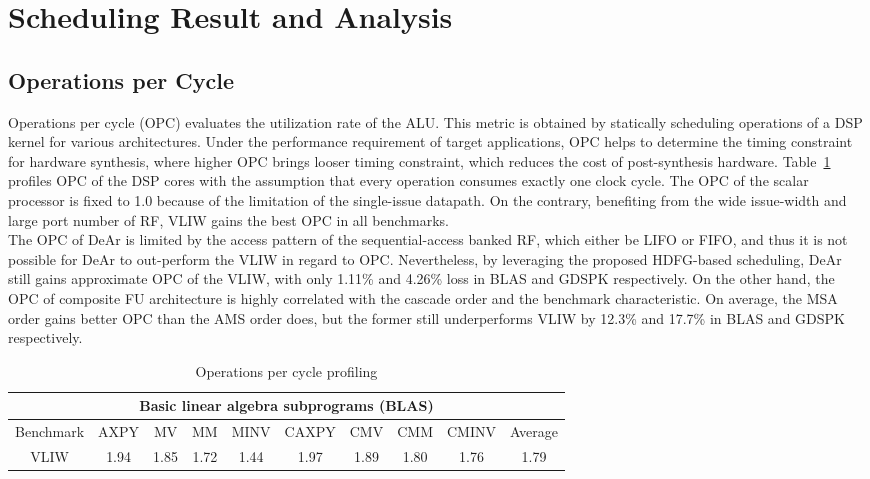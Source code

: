 \section{Scheduling Result and Analysis}
{
    \subsection{Operations per Cycle}
    Operations per cycle (OPC) evaluates the utilization rate of the ALU.
    This metric is obtained by statically scheduling operations of a DSP kernel for various architectures.
    Under the performance requirement of target applications, OPC helps to determine the timing constraint for hardware synthesis, 
    where higher OPC brings looser timing constraint, which reduces the cost of post-synthesis hardware.
    Table~\ref{tab:opc} profiles OPC of the DSP cores with the assumption that every operation consumes exactly one clock cycle.
    The OPC of the scalar processor is fixed to 1.0 because of the limitation of the single-issue datapath.
    On the contrary, benefiting from the wide issue-width and large port number of RF, VLIW gains the best OPC in all benchmarks.
    \\\indent
    The OPC of DeAr is limited by the access pattern of the sequential-access banked RF, which either be LIFO or FIFO, 
    and thus it is not possible for DeAr to out-perform the VLIW in regard to OPC.
    Nevertheless, by leveraging the proposed HDFG-based scheduling,  
    DeAr still gains approximate OPC of the VLIW, with only 1.11\% and 4.26\% loss in BLAS and GDSPK respectively.
    On the other hand, the OPC of composite FU architecture is highly correlated with the cascade order and the benchmark characteristic. 
    On average, the MSA order gains better OPC than the AMS order does, 
    but the former still underperforms VLIW by 12.3\% and 17.7\% in BLAS and GDSPK respectively.
    \begin{table}[!ht]
        \centering
        \caption{Operations per cycle profiling}
        \label{tab:opc}
        \resizebox{\columnwidth}{!}
        {
            \begin{tabular}{|c|c|c|c|c|c|c|c|c|c|}
                \hline
                \multicolumn{10}{|c|}{\textbf{Basic linear algebra subprograms (BLAS)}} \\ \hline
                Benchmark  &  AXPY  &  MV  &  MM  &  MINV  &  CAXPY  &  CMV  &  CMM  &  CMINV  &  Average \\ \hline 
                VLIW  &   1.94  &   1.85  &   1.72  &   1.44  &   1.97  &   1.89  &   1.80  &   1.76  &   1.79     \\ \hline 

\end{tabular}}
\end{table}}
